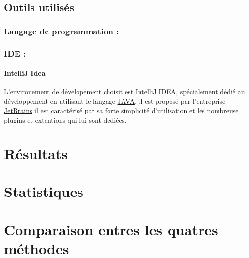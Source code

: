 \subsection{Outils utilisés}
\subsubsection{Langage de programmation : }
\paragraph{}

\subsubsection{IDE : }
\paragraph{}
\paragraph{IntelliJ Idea} L'environement de dévelopement choisit est \href{URL}{IntelliJ IDEA}, spécialement dédié au développement en utilisant le langage \href{URL}{JAVA}, il est proposé par l'entreprise \href{https://www.jetbrains.com}{JetBrains} il est caractérisé par sa forte simplicité d'utilisation et les nombreuse plugins et extentions qui lui sont dédiées.

\section{Résultats}\label{tests}
\paragraph{}
\section{Statistiques}
\paragraph{}
\section{Comparaison entres les quatres méthodes}
\paragraph{}